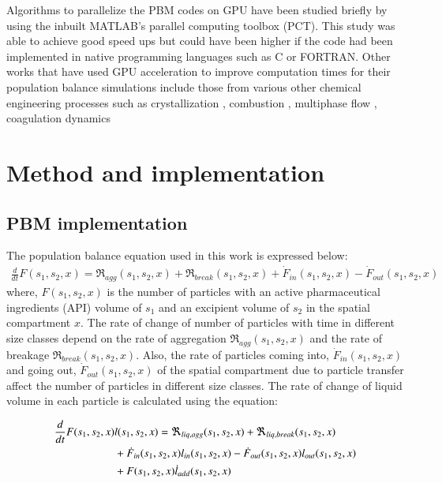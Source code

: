 \documentclass[preprint,10pt,authoryear,review]{elsarticle}
\begin{document}
\begin{linenumbers}
Algorithms to parallelize the PBM codes on GPU have been studied briefly by \cite{Prakash2013b} 
using the inbuilt MATLAB's parallel computing toolbox (PCT). This study was able to achieve 
good speed ups but could have been higher if the code had been implemented in native programming 
languages such as C or FORTRAN. Other works that have used GPU acceleration to improve computation 
times for their population balance simulations include those from various other chemical engineering 
processes such as crystallization \citep{Szilagy2016} , combustion \citep{Shi2012} , multiphase flow 
\citep{santos2013} , coagulation dynamics \citep{Xu2015}


\section{Method and implementation}
\label{secMethods}
\subsection{PBM implementation}
The population balance equation used in this work is expressed below:
\begin{align}
\frac{d}{dt}F(s_1,s_2,x)=\Re_{agg}(s_1,s_2,x)+\Re_{break}(s_1,s_2,x)+\dot{F}_{in}(s_1,s_2,x)-\dot{F}_{out}(s_1,s_2,x)
\label{eqn:mthds_pbm_overall} 
\end{align}
where, $F(s_1,s_2,x)$ is the number of particles with an active pharmaceutical ingredients (API) volume of $s_1$ and an excipient 
volume of $s_2$ in the spatial compartment $x$. The rate of change of number of particles with time 
in different size classes depend on the rate of aggregation $\Re_{agg}(s_1,s_2,x)$ and the rate of 
breakage $\Re_{break}(s_1,s_2,x)$. Also, the rate of particles coming into, $\dot{F}_{in}(s_1,s_2,x)$ and 
going out, $\dot{F}_{out}(s_1,s_2,x)$ of the spatial compartment due to particle transfer affect the number of 
particles in different size classes. 
The rate of change of liquid volume in each particle is calculated using the equation: 

\begin{align}
\frac{d}{dt}F(s_1,s_2,x)&l(s_1,s_2,x)= 
\Re_{liq,agg}(s_1,s_2,x)+\Re_{liq,break}(s_1,s_2,x)\notag\\
&+\dot{F}_{in}(s_1,s_2,x)l_{in}(s_1,s_2,x)-\dot{F}_{out}(s_1,s_2,x)l_{out}(s_1,s_2,x)\notag \\&+F(s_1,s_2,x)\dot{l}_{add}(s_1,s_2,x)
\label{eqn:mthds_pbm_rate} 
\end{align}


\end{linenumbers}
\end{document}
